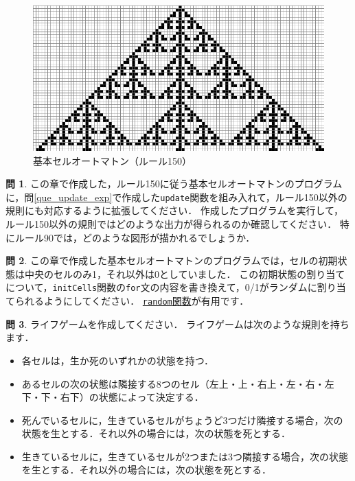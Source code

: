 \documentclass[dvipdfmx]{jsarticle}
\theoremstyle{definition}
\newtheorem{question}{問}[section]
\begin{document}
\begin{figure}[ht]
\begin{center}
    \includegraphics[scale=0.35]{figure/eca.png}
\end{center}
\caption{基本セルオートマトン（ルール150）}
\label{pic_eca}
\end{figure}


\vspace{\baselineskip}

\begin{question}
    \label{que_cmpECA}
    この章で作成した，ルール150に従う基本セルオートマトンのプログラムに，問\ref{que_update_exp}で作成した\verb|update|関数を組み入れて，ルール150以外の規則にも対応するように拡張してください．
    作成したプログラムを実行して，ルール150以外の規則ではどのような出力が得られるのか確認してください．
    特にルール90では，どのような図形が描かれるでしょうか．
\end{question}

\begin{question}
    この章で作成した基本セルオートマトンのプログラムでは，セルの初期状態は中央のセルのみ1，それ以外は0としていました．
    この初期状態の割り当てについて，\verb|initCells|関数の\verb|for|文の内容を書き換えて，0/1がランダムに割り当てられるようにしてください．
    \href{https://processing.org/reference/random_.html}{\texttt{random}関数}が有用です．
\end{question}

\begin{question}
    ライフゲームを作成してください．
    ライフゲームは次のような規則を持ちます．
    \begin{itemize}
        \item 各セルは，生か死のいずれかの状態を持つ．
        \item あるセルの次の状態は隣接する8つのセル（左上・上・右上・左・右・左下・下・右下）の状態によって決定する．
        \item 死んでいるセルに，生きているセルがちょうど3つだけ隣接する場合，次の状態を生とする．それ以外の場合には，次の状態を死とする．
        \item 生きているセルに，生きているセルが2つまたは3つ隣接する場合，次の状態を生とする．それ以外の場合には，次の状態を死とする．
    \end{itemize}
\end{question}
\end{document}
